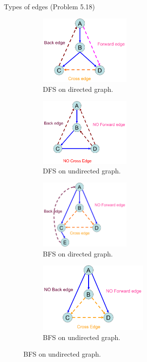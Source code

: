 \begin{frame}{Types of edges (Problem 5.18)}
  \begin{figure}
	\begin{subfigure}{0.50\linewidth}
	  \centering
	  \includegraphics[width=0.50\textwidth]{figs/dfs-digraph.png}
	  \caption{DFS on directed graph.}
	\end{subfigure}%
	\begin{subfigure}{0.50\linewidth}
	  \centering
	  \includegraphics[width=0.50\textwidth]{figs/dfs-undirected.png}
	  \caption{DFS on undirected graph.}
	\end{subfigure}

	\begin{subfigure}{0.50\linewidth}
	  \centering
	  \includegraphics[width=0.50\textwidth]{figs/bfs-digraph.png}
	  \caption{BFS on directed graph.}
	\end{subfigure}%
	\begin{subfigure}{0.50\linewidth}
	  \centering
	  \includegraphics[width=0.60\textwidth]{figs/bfs-undirected.png}
	  \caption{BFS on undirected graph.}
	\end{subfigure}
  \end{figure}
\end{frame}

